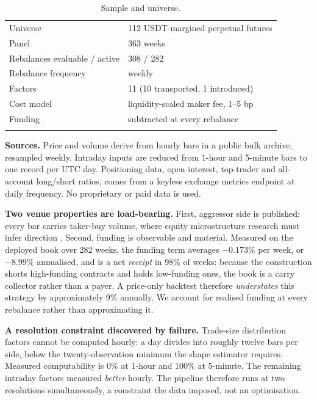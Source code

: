\documentclass[11pt,letterpaper]{article}
\begin{document}
\begin{table}[!htbp]\centering
\caption{Sample and universe.}\label{tab:data}
\begin{tabular}{ll}
\toprule
Universe & 112 USDT-margined perpetual futures \\
Panel & 363 weeks \\
Rebalances evaluable / active & 308 / 282 \\
Rebalance frequency & weekly \\
Factors & 11 (10 transported, 1 introduced) \\
Cost model & liquidity-scaled maker fee, 1--5 bp \\
Funding & subtracted at every rebalance \\
\addlinespace[2pt]
\bottomrule
\end{tabular}
\end{table}

\textbf{Sources.} Price and volume derive from hourly bars in a public bulk
archive, resampled weekly. Intraday inputs are reduced from 1-hour and 5-minute
bars to one record per UTC day. Positioning data, open interest, top-trader and
all-account long/short ratios, comes from a keyless exchange metrics endpoint at
daily frequency. No proprietary or paid data is used.

\textbf{Two venue properties are load-bearing.} First, aggressor side is
published: every bar carries taker-buy volume, where equity microstructure
research must infer direction \citep{leeready1991}. Second, funding is observable
and material. Measured on the deployed book over 282 weeks, the funding term
averages $-0.173\%$ per week, or $-8.99\%$ annualised, and is a net \emph{receipt}
in 98\% of weeks: because the construction shorts high-funding contracts and
holds low-funding ones, the book is a carry collector rather than a payer. A
price-only backtest therefore \emph{understates} this strategy by approximately
9\% annually. We account for realised funding at every rebalance rather than
approximating it.

\textbf{A resolution constraint discovered by failure.} Trade-size distribution
factors cannot be computed hourly: a day divides into roughly twelve bars per
side, below the twenty-observation minimum the shape estimator requires. Measured
computability is 0\% at 1-hour and 100\% at 5-minute. The remaining intraday
factors measured \emph{better} hourly. The pipeline therefore runs at two
resolutions simultaneously, a constraint the data imposed, not an optimisation.
\end{document}
